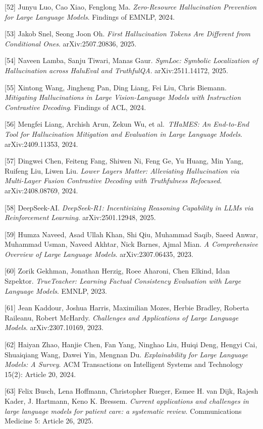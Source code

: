 {[}52{]} Junyu Luo, Cao Xiao, Fenglong Ma. \emph{Zero-Resource Hallucination Prevention for Large Language Models}. Findings of EMNLP, 2024.

{[}53{]} Jakob Snel, Seong Joon Oh. \emph{First Hallucination Tokens Are Different from Conditional Ones}. arXiv:2507.20836, 2025.

{[}54{]} Naveen Lamba, Sanju Tiwari, Manas Gaur. \emph{SymLoc: Symbolic Localization of Hallucination across HaluEval and TruthfulQA}. arXiv:2511.14172, 2025.

{[}55{]} Xintong Wang, Jingheng Pan, Ding Liang, Fei Liu, Chris Biemann. \emph{Mitigating Hallucinations in Large Vision-Language Models with Instruction Contrastive Decoding}. Findings of ACL, 2024.

{[}56{]} Mengfei Liang, Archish Arun, Zekun Wu, et al.~\emph{THaMES: An End-to-End Tool for Hallucination Mitigation and Evaluation in Large Language Models}. arXiv:2409.11353, 2024.

{[}57{]} Dingwei Chen, Feiteng Fang, Shiwen Ni, Feng Ge, Yu Huang, Min Yang, Ruifeng Liu, Liwen Liu. \emph{Lower Layers Matter: Alleviating Hallucination via Multi-Layer Fusion Contrastive Decoding with Truthfulness Refocused}. arXiv:2408.08769, 2024.

{[}58{]} DeepSeek-AI. \emph{DeepSeek-R1: Incentivizing Reasoning Capability in LLMs via Reinforcement Learning}. arXiv:2501.12948, 2025.

{[}59{]} Humza Naveed, Asad Ullah Khan, Shi Qiu, Muhammad Saqib, Saeed Anwar, Muhammad Usman, Naveed Akhtar, Nick Barnes, Ajmal Mian. \emph{A Comprehensive Overview of Large Language Models}. arXiv:2307.06435, 2023.

{[}60{]} Zorik Gekhman, Jonathan Herzig, Roee Aharoni, Chen Elkind, Idan Szpektor. \emph{TrueTeacher: Learning Factual Consistency Evaluation with Large Language Models}. EMNLP, 2023.

{[}61{]} Jean Kaddour, Joshua Harris, Maximilian Mozes, Herbie Bradley, Roberta Raileanu, Robert McHardy. \emph{Challenges and Applications of Large Language Models}. arXiv:2307.10169, 2023.

{[}62{]} Haiyan Zhao, Hanjie Chen, Fan Yang, Ninghao Liu, Huiqi Deng, Hengyi Cai, Shuaiqiang Wang, Dawei Yin, Mengnan Du. \emph{Explainability for Large Language Models: A Survey}. ACM Transactions on Intelligent Systems and Technology 15(2): Article 20, 2024.

{[}63{]} Felix Busch, Lena Hoffmann, Christopher Rueger, Esmee H. van Dijk, Rajesh Kader, J. Hartmann, Keno K. Bressem. \emph{Current applications and challenges in large language models for patient care: a systematic review}. Communications Medicine 5: Article 26, 2025.

